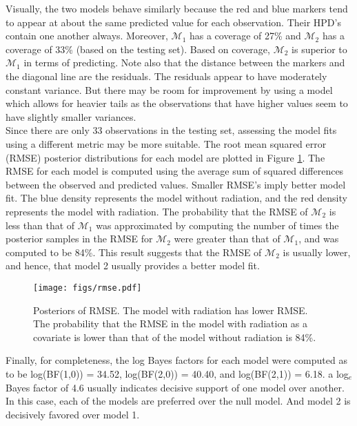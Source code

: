 \documentclass{../../tex_template/asaproc}
\newcommand{\M}{\mathcal{M}}
\begin{document}
Visually, the two models behave similarly because the red and blue markers tend
to appear at about the same predicted value for each observation. Their HPD's
contain one another always. Moreover, $\M_1$ has a coverage of 27\% and $\M_2$ has
a coverage of 33\% (based on the testing set). Based on coverage, $\M_2$ is superior
to $\M_1$ in terms of predicting. Note also that the distance between
the markers and the diagonal line are the residuals. The residuals appear
to have moderately constant variance. But there may be room for improvement
by using a model which allows for heavier tails as the observations that
have higher values seem to have slightly smaller variances.\\

Since there are only 33 observations in the testing set, assessing the model
fits using a different metric may be more suitable. The root mean squared error
(RMSE) posterior distributions for each model are plotted in Figure
\ref{fig:rmse}. The RMSE for each model is computed using the average sum of
squared differences between the observed and predicted values. Smaller RMSE's
imply better model fit. The blue density represents the model without
radiation, and the red density represents the model with radiation.  The
probability that the RMSE of $\M_2$ is less than that of $\M_1$ was
approximated by computing the number of times the posterior samples in the RMSE
for $\M_2$ were greater than that of $\M_1$, and was computed to be 84\%.
This result suggests that the RMSE of $\M_2$ is usually lower, and hence, that
model 2 usually provides a better model fit.
\begin{figure}[H]
  \texttt{[image: figs/rmse.pdf]}
  \caption{\small Posteriors of RMSE. The model with radiation has lower RMSE.
    The probability that the RMSE in the model with radiation as a covariate
    is lower than that of the model without radiation is 84\%.}
  \label{fig:rmse}
\end{figure}

Finally, for completeness, the log Bayes factors for each model were computed
as to be log(BF(1,0)) = 34.52, log(BF(2,0)) =  40.40, and log(BF(2,1)) = 6.18.
a log$_e$ Bayes factor of 4.6 usually indicates decisive support of one model
over another. In this case, each of the models are preferred over the null
model. And model 2 is decisively favored over model 1. \\
\end{document}
